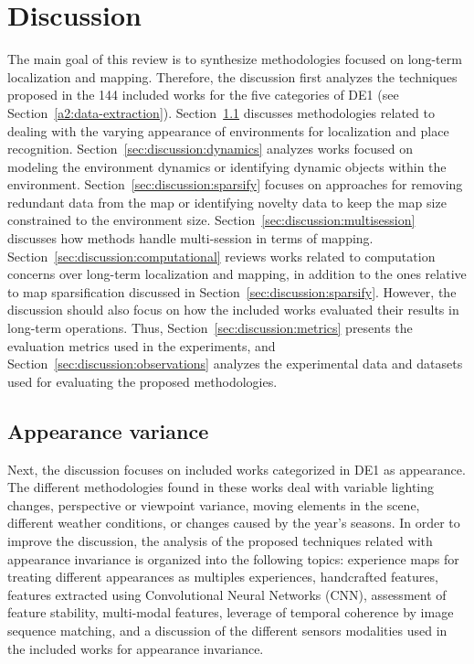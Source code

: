 \section{Discussion}
\label{sec:discussion}

The main goal of this review is to synthesize methodologies focused on long-term localization and mapping. Therefore, the discussion first analyzes the techniques proposed in the 144 included works for the five categories of DE1 (see Section~\ref{a2:data-extraction}). Section~\ref{sec:discussion:appearance} discusses methodologies related to dealing with the varying appearance of environments for localization and place recognition. Section~\ref{sec:discussion:dynamics} analyzes works focused on modeling the environment dynamics or identifying dynamic objects within the environment. Section~\ref{sec:discussion:sparsify} focuses on approaches for removing redundant data from the map or identifying novelty data to keep the map size constrained to the environment size. Section~\ref{sec:discussion:multisession} discusses how methods handle multi-session in terms of mapping. Section~\ref{sec:discussion:computational} reviews works related to computation concerns over long-term localization and mapping, in addition to the ones relative to map sparsification discussed in Section~\ref{sec:discussion:sparsify}. However, the discussion should also focus on how the included works evaluated their results in long-term operations. Thus, Section~\ref{sec:discussion:metrics} presents the evaluation metrics used in the experiments, and Section~\ref{sec:discussion:observations} analyzes the experimental data and datasets used for evaluating the proposed methodologies.





\subsection{Appearance variance}
\label{sec:discussion:appearance}

Next, the discussion focuses on included works categorized in DE1 as appearance. The different methodologies found in these works deal with variable lighting changes, perspective or viewpoint variance, moving elements in the scene, different weather conditions, or changes caused by the year's seasons.
In order to improve the discussion, the analysis of the proposed techniques related with appearance invariance is organized into the following topics: experience maps for treating different appearances as multiples experiences, handcrafted features, features extracted using Convolutional Neural Networks (CNN), assessment of feature stability, multi-modal features, leverage of temporal coherence by image sequence matching, and a discussion of the different sensors modalities used in the included works for appearance invariance.



